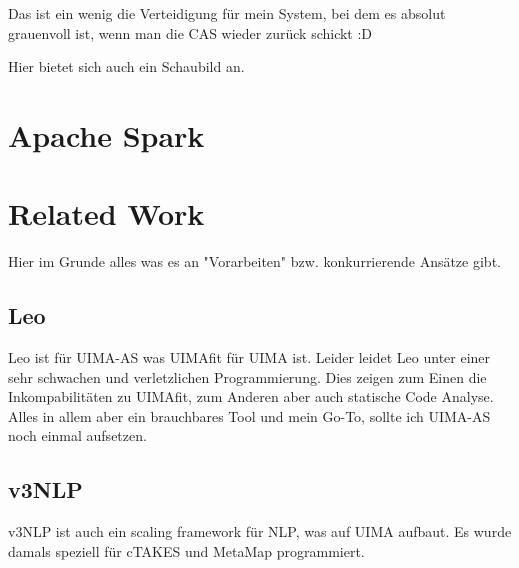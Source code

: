 Das ist ein wenig die Verteidigung für mein System, bei dem es absolut grauenvoll ist, wenn man die CAS wieder zurück schickt :D

Hier bietet sich auch ein Schaubild an.

\section{Apache Spark}


\section{Related Work}
Hier im Grunde alles was es an "Vorarbeiten" bzw. konkurrierende Ansätze gibt.

\subsection{Leo}
Leo ist für UIMA-AS was UIMAfit für UIMA ist. Leider leidet Leo unter einer sehr schwachen und verletzlichen Programmierung. Dies zeigen zum Einen die Inkompabilitäten zu UIMAfit, zum Anderen aber auch statische Code Analyse. Alles in allem aber ein brauchbares Tool und mein Go-To, sollte ich UIMA-AS noch einmal aufsetzen.

\subsection{v3NLP}
v3NLP ist auch ein scaling framework für NLP, was auf UIMA aufbaut. Es wurde damals speziell für cTAKES und MetaMap programmiert.



% 
% 
% 
